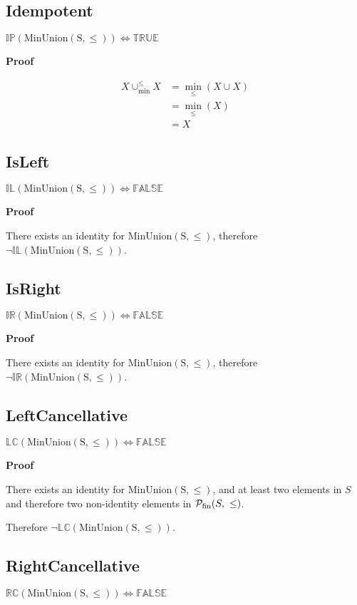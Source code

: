 \documentclass[10pt]{article}
\newcommand{\propname}[1]{{\mathbb{#1}}}
\newcommand{\minunion}{\cup_{\min}^{\leq}}
\newcommand{\proof}{\vspace{1em} \textbf{Proof} \vspace{1em}}
\begin{document}
\subsection{Idempotent}
$\propname{IP}(\mathrm{MinUnion(S,\leq)}) \Leftrightarrow \propname{TRUE}$

\proof

\begin{align*}
X \minunion X 	& = \min_\leq(X \cup X) \\
				& = \min_\leq(X) \\
				& = X
\end{align*}



\subsection{IsLeft}
$\propname{IL}(\mathrm{MinUnion(S,\leq)}) \Leftrightarrow \propname{FALSE}$

\proof

There exists an identity for $\mathrm{MinUnion(S,\leq)}$, therefore $\neg \propname{IL}(\mathrm{MinUnion(S,\leq)})$.



\subsection{IsRight}
$\propname{IR}(\mathrm{MinUnion(S,\leq)}) \Leftrightarrow \propname{FALSE}$

\proof

There exists an identity for $\mathrm{MinUnion(S,\leq)}$, therefore $\neg \propname{IR}(\mathrm{MinUnion(S,\leq)})$.



\subsection{LeftCancellative}
$\propname{LC}(\mathrm{MinUnion(S,\leq)}) \Leftrightarrow \propname{FALSE}$

\proof

There exists an identity for $\mathrm{MinUnion(S,\leq)}$, and at least two elements in $S$ and therefore two non-identity elements in ${\cal P}_{\mathrm{fin}}(S,\ \leq)$.
 
\vspace{0.5em}

Therefore $\neg \propname{LC}(\mathrm{MinUnion(S,\leq)})$.

\subsection{RightCancellative}
$\propname{RC}(\mathrm{MinUnion(S,\leq)}) \Leftrightarrow \propname{FALSE}$
\end{document}
